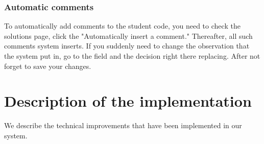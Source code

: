\documentclass{acmtog} %
\begin{document}
\subsubsection*{Automatic comments}
To automatically add comments to the student code, you need to check the solutions page, click the "Automatically insert a comment." Thereafter, all such comments system inserts. If you suddenly need to change the observation that the system put in, go to the field and the decision right there replacing. After not forget to save your changes.


\section{Description of the implementation}
\label{sec:description_implementation}
%
We describe the technical improvements that have been implemented in our system.
\end{document}

